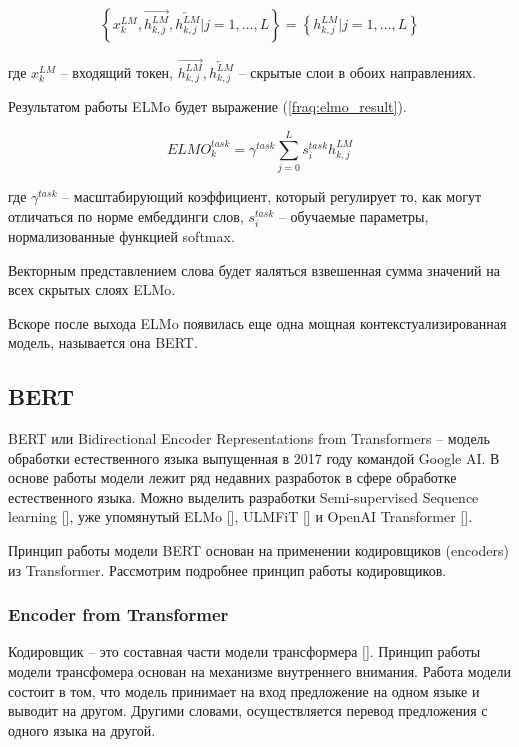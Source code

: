 \documentclass[a4paper,14pt]{article}
\begin{document}
\begin{equation}
	\left\{ x_k^{LM}, \overrightarrow{h_{k,j}^{LM}}, \overleftarrow{h_{k,j}^{LM}}  |j = 1, ...,L\right\} = 
	\left\{h_{k,j}^{LM}|j = 1, ...,L
	\right\}
	\label{fraq:array_elmo}
\end{equation}

где $x_k^{LM}$ -- входящий токен, $\overrightarrow{h_{k,j}^{LM}}, \overleftarrow{h_{k,j}^{LM}}$ -- скрытые слои в обоих направлениях.

Результатом работы ELMo будет выражение (\ref{fraq:elmo_result}).

\begin{equation}
	ELMO_k^{task} = \gamma^{task}\sum_{j=0}^{L} s_{i}^{task}h_{k,j}^{LM}
	\label{fraq:elmo_result}
\end{equation}

где $\gamma^{task}$ -- масштабирующий коэффициент, который регулирует то, как могут отличаться по норме ембеддинги слов, $s_{i}^{task}$ -- обучаемые параметры, нормализованные функцией softmax.

Векторным представлением слова будет яаляться взвешенная сумма значений на всех скрытых слоях ELMo.

Вскоре после выхода ELMo появилась еще одна мощная контекстуализированная модель, называется она BERT.

\subsection{BERT}

BERT или Bidirectional Encoder Representations from Transformers -- модель обработки естественного языка выпущенная в 2017 году командой Google AI.
В основе работы модели лежит ряд недавних разработок в сфере обработке естественного языка.
Можно выделить разработки Semi-supervised Sequence learning [], уже упомянутый ELMo [], ULMFiT [] и OpenAI Transformer [].

Принцип работы модели BERT основан на применении кодировщиков (encoders) из Transformer.
Рассмотрим подробнее принцип работы кодировщиков.

\subsubsection{Encoder from Transformer}

Кодировщик -- это составная части модели трансформера [].
Принцип работы модели трансфомера основан на механизме внутреннего внимания.
Работа модели состоит в том, что модель принимает на вход предложение на одном языке и выводит на другом.
Другими словами, осуществляется перевод предложения с одного языка на другой.
\end{document}

